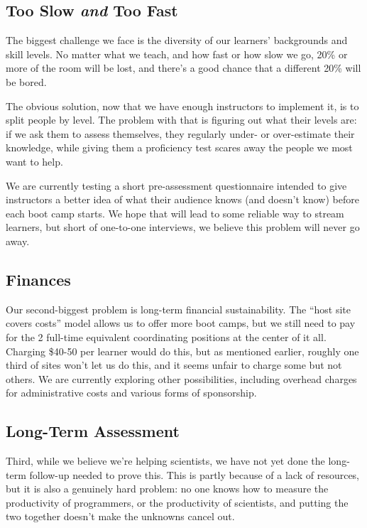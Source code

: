 \documentclass[10pt,a4paper,twocolumn]{article}
\begin{document}
\subsection*{Too Slow \emph{and} Too Fast}

The biggest challenge we face is the diversity of our learners'
backgrounds and skill levels. No matter what we teach, and how fast or
how slow we go, 20\% or more of the room will be lost, and there's a
good chance that a different 20\% will be bored.

The obvious solution, now that we have enough instructors to implement
it, is to split people by level. The problem with that is figuring out
what their levels are: if we ask them to assess themselves, they
regularly under- or over-estimate their knowledge, while giving them a
proficiency test scares away the people we most want to help.

We are currently testing a short pre-assessment questionnaire intended
to give instructors a better idea of what their audience knows (and
doesn't know) before each boot camp starts. We hope that will lead to
some reliable way to stream learners, but short of one-to-one
interviews, we believe this problem will never go away.

\subsection*{Finances}

Our second-biggest problem is long-term financial sustainability. The
``host site covers costs'' model allows us to offer more boot camps, but
we still need to pay for the 2 full-time equivalent coordinating
positions at the center of it all. Charging \$40-50 per learner would do
this, but as mentioned earlier, roughly one third of sites won't let us
do this, and it seems unfair to charge some but not others. We are
currently exploring other possibilities, including overhead charges for
administrative costs and various forms of sponsorship.

\subsection*{Long-Term Assessment}

Third, while we believe we're helping scientists, we have not yet done
the long-term follow-up needed to prove this. This is partly because of
a lack of resources, but it is also a genuinely hard problem: no one
knows how to measure the productivity of programmers, or the
productivity of scientists, and putting the two together doesn't make
the unknowns cancel out.
\end{document}
